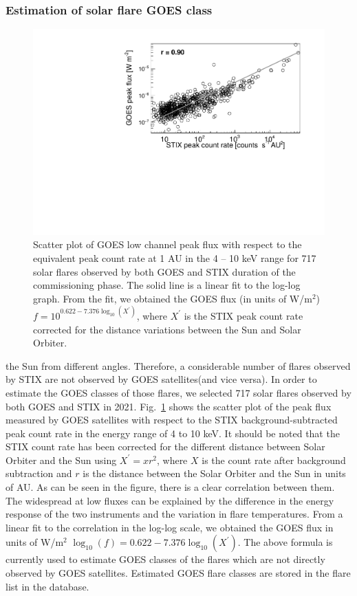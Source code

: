 \documentclass[referee]{aa} %
\begin{document}
\subsubsection{Estimation of solar flare GOES class }
\begin{figure}
  \centering
  \includegraphics[width=0.8\linewidth]{figures/goes_stix_flux_paper.pdf}
  \caption{Scatter plot of GOES low channel peak flux with respect to the equivalent  peak count rate  at 1 AU
   in the 4 -- 10 keV range
  for 717 solar flares observed by both GOES and STIX duration of the commissioning phase. 
  The solid line is a linear fit to the log-log graph. 
From the fit, we obtained 
the GOES flux (in units of W/m$^2$) $f = 10^{0.622 -7.376 \log_{10} (X^{'})}$,
where $X^{'}$ is the STIX peak count rate corrected for the distance variations between the Sun and Solar Orbiter. 
}
\label{fig:goes-stix}
\end{figure}
the Sun from different angles. Therefore, a considerable number of flares observed by STIX
 are not observed by GOES satellites(and vice versa). 
In order to estimate the GOES classes of those flares, 
we selected 717 solar flares observed by both GOES and STIX in 2021. 
Fig.~\ref{fig:goes-stix} shows the scatter plot of the peak flux
measured by GOES satellites
 with respect to the STIX background-subtracted peak count rate in the energy range of 4 to 10 keV. 
It should be noted that the STIX count rate 
has been corrected for 
the different distance between Solar Orbiter and the Sun using $X^{'}=x r^2$, where $X$ is the count rate after background subtraction
 and $r$ is the distance between the Solar Orbiter and the Sun in units of AU. 
As can be seen in the figure, there is a clear correlation between
them.  The widespread at low fluxes can be explained by the difference in 
the energy response of the two instruments and the variation in flare temperatures. 
From a linear fit to the correlation in the log-log scale, 
we obtained the GOES flux in units of W/m$^2$ $\log_{10}(f) = 0.622 -7.376 \log_{10} (X^{'})$.
The above formula is currently used to estimate GOES classes of the flares
which are not directly observed by GOES satellites.  
Estimated GOES flare classes are stored in the flare list in the database. 
\end{document}
